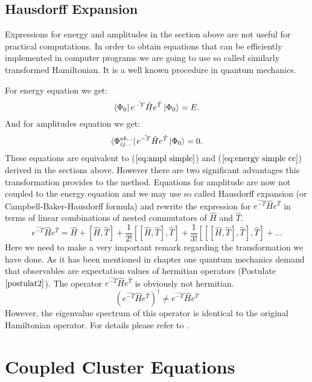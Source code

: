 \documentclass[twoside,english]{uiofysmaster}
\theoremstyle{definition}
\begin{document}
\subsection{Hausdorff Expansion} \label{sec:Hausdorf}
Expressions for energy and amplitudes in the section above are not useful for practical computations. In order to obtain equations that can be efficiently implemented in computer programs we are going to use so called similarly transformed Hamiltonian. It is a well known procedure in quantum mechanics. 

For energy equation we get:
\begin{equation}\label{eq:energy_cc1}
\bra{\Phi_0} e^{\hat{-T}} \hat{H} e^{\hat{T}} \ket{\Phi_0}   = E. 
\end{equation}
And for amplitudes equation we get:
\begin{equation}\label{eq:amplitudesgeneral}
\bra{\Phi_{ij...}^{ab...}}e^{\hat{-T}} \hat{H} e^{\hat{T}} \ket{\Phi_0}   = 0.
\end{equation} 
These equations are equivalent to ($\ref{eq:ampl simple}$) and ($\ref{eq:energy simple cc}$) derived in the sections above. However there are two significant advantages this transformation provides to the method. Equations for amplitude are now not coupled to the energy equation and we may use so called Hausdorff expansion (or Campbell-Baker-Hausdorff formula) and rewrite the expression for $ e^{\hat{-T}} \hat{H} e^{\hat{T}} $ in terms of linear combinations of nested commutators of $ \hat{H} $ and $\hat{T}$.
\begin{equation}
e^{\hat{-T}} \hat{H} e^{\hat{T}} = \hat{H} + [\hat{H},\hat{T}] + \frac{1}{2!}[[\hat{H},\hat{T}],\hat{T}] + \frac{1}{3!}[[[\hat{H},\hat{T}],\hat{T}],\hat{T}] + ...
\end{equation} 
Here we need to make a very important remark regarding the transformation we have done. As it has been mentioned in chapter one quantum mechanics demand that observables are expectation values of hermitian operators (Postulate $\ref{postulat2}$). The operator  $e^{\hat{-T}} \hat{H} e^{\hat{T}} $ is obviously not hermitian. 
\begin{equation}
(e^{\hat{-T}} \hat{H} e^{\hat{T}})^\dagger \neq e^{\hat{-T}} \hat{H} e^{\hat{T}}
\end{equation} 
However, the eigenvalue spectrum of this operator is identical to the original Hamiltonian operator. For details please refer to \cite{kutzelniggAlmostVariationalCoupled}.

\section{Coupled Cluster Equations}
\end{document}
